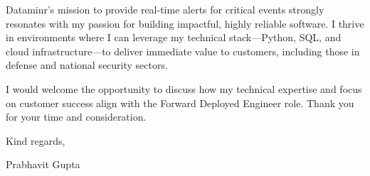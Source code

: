 \documentclass[11pt,a4paper]{article}
\begin{document}
\noindent Dataminr's mission to provide real-time alerts for critical events strongly resonates with my passion for building impactful, highly reliable software. I thrive in environments where I can leverage my technical stack---Python, SQL, and cloud infrastructure---to deliver immediate value to customers, including those in defense and national security sectors.

\vspace{10pt}

\noindent I would welcome the opportunity to discuss how my technical expertise and focus on customer success align with the Forward Deployed Engineer role. Thank you for your time and consideration.

\vspace{10pt}

\noindent Kind regards,

\vspace{10pt}

\noindent Prabhavit Gupta
\end{document}
